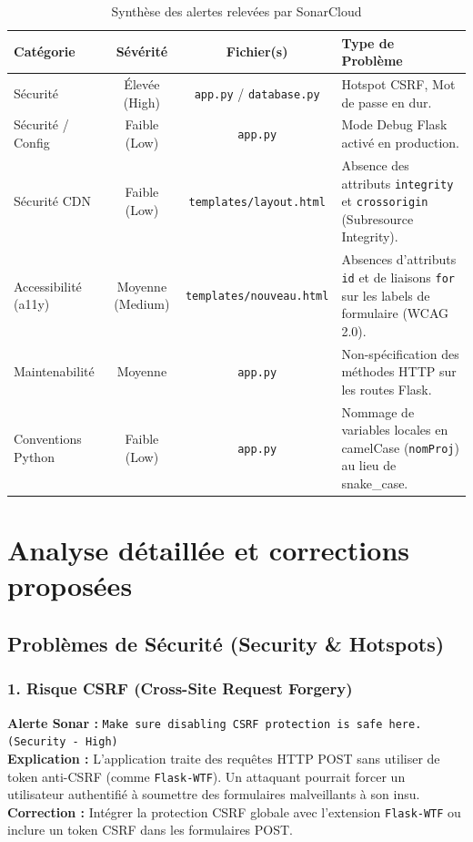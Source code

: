 \documentclass[12pt,a4paper]{article}
\begin{document}
\begin{table}[htbp]
\centering
\caption{Synthèse des alertes relevées par SonarCloud}
\vspace{0.2cm}
\small
\begin{tabular}{|l|c|c|p{6cm}|}
\hline
\textbf{Catégorie} & \textbf{Sévérité} & \textbf{Fichier(s)} & \textbf{Type de Problème} \\ \hline
Sécurité & Élevée (High) & \texttt{app.py} / \texttt{database.py} & Hotspot CSRF, Mot de passe en dur. \\ \hline
Sécurité / Config & Faible (Low) & \texttt{app.py} & Mode Debug Flask activé en production. \\ \hline
Sécurité CDN & Faible (Low) & \texttt{templates/layout.html} & Absence des attributs \texttt{integrity} et \texttt{crossorigin} (Subresource Integrity). \\ \hline
Accessibilité (a11y) & Moyenne (Medium) & \texttt{templates/nouveau.html} & Absences d'attributs \texttt{id} et de liaisons \texttt{for} sur les labels de formulaire (WCAG 2.0). \\ \hline
Maintenabilité & Moyenne & \texttt{app.py} & Non-spécification des méthodes HTTP sur les routes Flask. \\ \hline
Conventions Python & Faible (Low) & \texttt{app.py} & Nommage de variables locales en camelCase (\texttt{nomProj}) au lieu de snake\_case. \\ \hline
\end{tabular}
\end{table}

\section{Analyse détaillée et corrections proposées}

\subsection{Problèmes de Sécurité (Security & Hotspots)}

\subsubsection{1. Risque CSRF (Cross-Site Request Forgery)}
\textbf{Alerte Sonar :} \texttt{Make sure disabling CSRF protection is safe here. (Security - High)}\\
\textbf{Explication :} L'application traite des requêtes HTTP POST sans utiliser de token anti-CSRF (comme \texttt{Flask-WTF}). Un attaquant pourrait forcer un utilisateur authentifié à soumettre des formulaires malveillants à son insu.\\
\textbf{Correction :} Intégrer la protection CSRF globale avec l'extension \texttt{Flask-WTF} ou inclure un token CSRF dans les formulaires POST.
\end{document}
